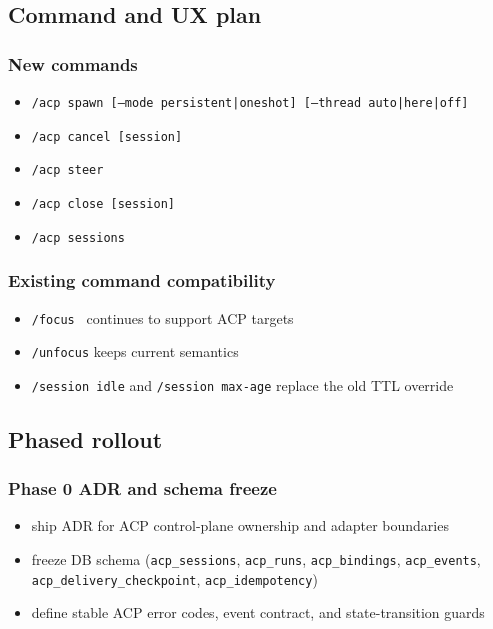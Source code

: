 \subsection{Command and UX plan}


\subsubsection{New commands}


\begin{itemize}
  \item \texttt{/acp spawn  [--mode persistent|oneshot] [--thread auto|here|off]}
  \item \texttt{/acp cancel [session]}
  \item \texttt{/acp steer }
  \item \texttt{/acp close [session]}
  \item \texttt{/acp sessions}
\end{itemize}


\subsubsection{Existing command compatibility}


\begin{itemize}
  \item \texttt{/focus } continues to support ACP targets
  \item \texttt{/unfocus} keeps current semantics
  \item \texttt{/session idle} and \texttt{/session max-age} replace the old TTL override
\end{itemize}


\subsection{Phased rollout}


\subsubsection{Phase 0 ADR and schema freeze}


\begin{itemize}
  \item ship ADR for ACP control-plane ownership and adapter boundaries
  \item freeze DB schema (\texttt{acp\_sessions}, \texttt{acp\_runs}, \texttt{acp\_bindings}, \texttt{acp\_events}, \texttt{acp\_delivery\_checkpoint}, \texttt{acp\_idempotency})
  \item define stable ACP error codes, event contract, and state-transition guards
\end{itemize}


